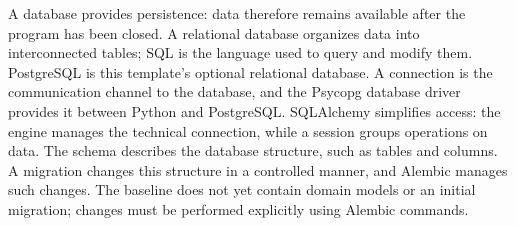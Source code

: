 \begin{beginnerstatement}

A database provides persistence: data therefore remains available after the
program has been closed. A relational database organizes data into
interconnected tables; SQL is the language used to query and modify them.
PostgreSQL is this template's optional relational database. A connection is the
communication channel to the database, and the Psycopg database driver provides
it between Python and PostgreSQL. SQLAlchemy simplifies access: the engine
manages the technical connection, while a session groups operations on data.
The schema describes the database structure, such as tables and columns. A
migration changes this structure in a controlled manner, and Alembic manages
such changes. The baseline does not yet contain domain models or an initial
migration; changes must be performed explicitly using Alembic commands.

\end{beginnerstatement}
